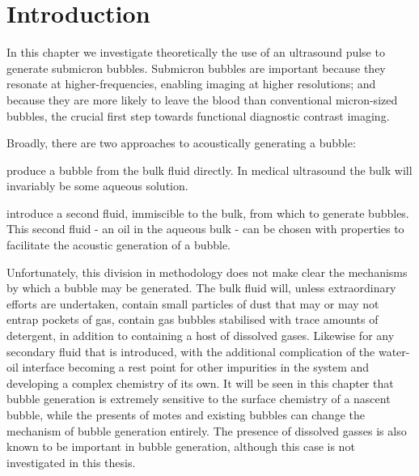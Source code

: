 
\section{Introduction}
In this chapter we investigate theoretically the use of an ultrasound pulse to generate submicron bubbles.
Submicron bubbles are important because they
resonate at higher-frequencies, enabling imaging at higher resolutions;
and because 
they are more likely to leave the blood than conventional micron-sized bubbles,
the crucial first step towards functional diagnostic contrast imaging.

Broadly, there are two approaches to acoustically generating a bubble:
\nlist
{
  \item produce a bubble from the bulk fluid directly.  
In medical ultrasound the bulk will invariably be some aqueous solution.
  \item introduce a second fluid, immiscible to the bulk, from which to generate bubbles.
This second fluid - an oil in the aqueous bulk - 
can be chosen with properties to facilitate the acoustic generation of a bubble.\label{item:nuc:oil}
}
Unfortunately, this division in methodology does not make clear the mechanisms
by which a bubble may be generated. %
The bulk fluid will, unless extraordinary efforts are undertaken,
contain small particles of dust that may or may not entrap pockets of gas,
contain gas bubbles stabilised with trace amounts of detergent,
in addition to containing a host of dissolved gases.
Likewise for any secondary fluid that is introduced,
with the additional complication of the water-oil interface 
becoming a rest point for other impurities in the system and 
developing a complex chemistry of its own.
It will be seen in this chapter that
bubble generation is extremely sensitive to the surface chemistry of a nascent bubble,
while the presents of motes and existing bubbles can change the
mechanism of bubble generation entirely.
The presence of dissolved gasses is also known to be important in bubble generation\cite{},
although this case is not investigated in this thesis.




